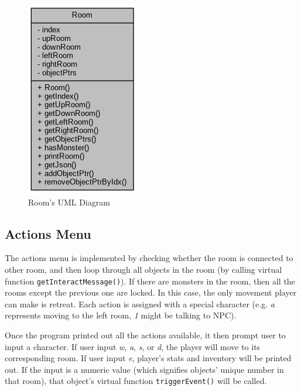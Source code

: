 \documentclass{article}
\begin{document}
\begin{figure}
\begin{center}
\begin{minipage}[c]{0.4\linewidth}
\begin{center}
                \includegraphics[width=0.7\linewidth]{room_uml}
                \end{center}
                \caption{Room's UML Diagram}
            \end{minipage}
        \end{center}
    \end{figure}
    
    \subsection{Actions Menu}
    The actions menu is implemented by checking whether the room is connected to other room, and then loop through all objects in the room (by calling virtual function \texttt{getInteractMessage()}). If there are monsters in the room, then all the rooms except the previous one are locked. In this case, the only movement player can make is retreat. Each action is assigned with a special character (e.g. \textit{a} represents moving to the left room, \textit{1} might be talking to NPC).
    \par
    Once the program printed out all the actions available, it then prompt user to input a character. If user input \textit{w}, \textit{a}, \textit{s}, or \textit{d}, the player will move to its corresponding room. If user input \textit{e}, player's stats and inventory will be printed out. If the input is a numeric value (which signifies objects' unique number in that room), that object's virtual function \texttt{triggerEvent()} will be called. 
    
\end{document}
